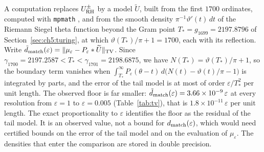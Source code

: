 A computation replaces $U^\pm_{\mathrm{RH}}$ by a model $\widetilde U$, built from the first $1700$ ordinates, computed with \texttt{mpmath} \cite{mpmath}, and from the smooth density $\pi^{-1}\vartheta'(t)\,dt$ of the Riemann Siegel theta function beyond the Gram point $T_*=g_{1699}=2197.8796$ of Section~\ref{sec:ch5:turing}, at which $\vartheta(T_*)/\pi+1=1700$, each with its reflection. Write $\tilde d_{\rm match}(\varepsilon)=\lVert \mu_\varepsilon-P_\varepsilon*\widetilde U\rVert_{\mathrm{TV}}$. Since $\gamma_{1700}=2197.2587<T_*<\gamma_{1701}=2198.6875$, we have $N(T_*)=\vartheta(T_*)/\pi+1$, so the boundary term vanishes when $\int_{T_*}^\infty P_\varepsilon(\theta-t)\,d\big(N(t)-\vartheta(t)/\pi-1\big)$ is integrated by parts, and the error of the tail model is at most of order $\varepsilon/T_*^2$ per unit length. The observed floor is far smaller: $\tilde d_{\rm match}(\varepsilon)=3.66\times10^{-9}\,\varepsilon$ at every resolution from $\varepsilon=1$ to $\varepsilon=0.005$ (Table~\ref{tab:tv}), that is $1.8\times10^{-11}\,\varepsilon$ per unit length. The exact proportionality to $\varepsilon$ identifies the floor as the residual of the tail model. It is an observed value, not a bound for $d_{\rm match}(\varepsilon)$, which would need certified bounds on the error of the tail model and on the evaluation of $\mu_\varepsilon$. The densities that enter the comparison are stored in double precision.


